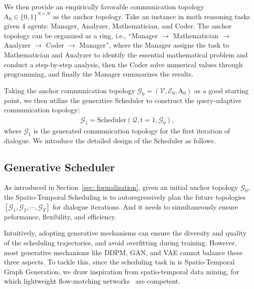 We then provide an empirically favorable communication topology $\mathrm{A}_0 \in \{0,1\}^{N\times N}$ as the anchor topology. Take an instance in math reasoning tasks given 4 agents: Manager, Analyzer, Mathematician, and Coder. The anchor topology can be organized as a ring, i.e., ``Manager $\rightarrow$ Mathematician $\rightarrow$ Analyzer $\rightarrow$ Coder $\rightarrow$ Manager'', where the Manager assigns the task to  Mathematician and Analyzer to identify the essential mathematical problem and conduct a step-by-step analysis, then the Coder solve numerical values through programming, and finally the Manager summarizes the results. 

Taking the anchor communication topology $\mathcal{G}_0 = (\mathcal{V}, \mathcal{E}_0, \mathrm{A}_0)$ as a good starting point, we then utilize the generative Scheduler to construct the query-adaptive communication topology:
\begin{gather}
    \mathcal{G}_1 = \text{Scheduler}(\mathcal{Q}, t=1, \mathcal{G}_0),
\end{gather}
where $\mathcal{G}_1$ is the generated communication topology for the first iteration of dialogue. We introduce the detailed design of the Scheduler as follows.

\subsection{Generative Scheduler}
As introduced in Section~\ref{sec: formalization}, given an initial anchor topology $\mathcal{G}_0$, the Spatio-Temporal Scheduling is to autoregressively plan the future topologies $[\mathcal{G}_1, \mathcal{G}_2, \cdots, \mathcal{G}_T]$ for dialogue iterations. And it needs to simultaneously ensure  peformance,  flexibility, and  efficiency. 

Intuitively, adopting generative mechanisms can ensure the diversity and quality of the scheduling trajectories, and avoid overfitting during training. However, most generative mechanisms like DDPM, GAN, and VAE cannot balance these three aspects. To tackle this, since the scheduling task in \ourmethod is Spatio-Temporal Graph Generation, we draw inspiration from spatio-temporal data mining, for which lightweight flow-matching networks~\citep{liusundial,wu2026aurora} are competent. 

